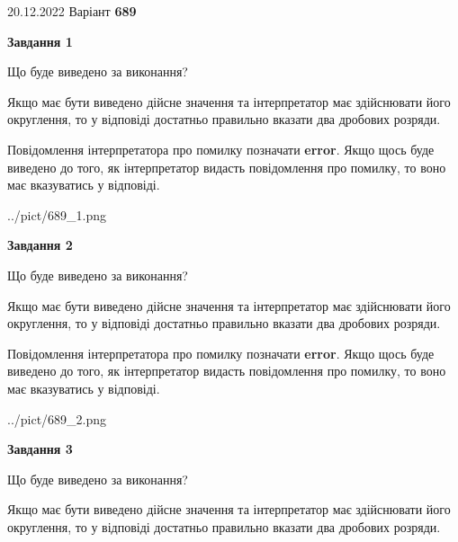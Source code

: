 \documentclass[12pt, ukrainian]{article}
\begin{document}
{20.12.2022 Варіант \No \textbf { 689 }\par}
{
\begin {Large}

{\begin {center}\textbf{Завдання 1}\end {center}}\par
Що буде виведено за виконання? \par

Якщо має бути виведено дійсне значення та інтерпретатор має здійснювати його округлення, 
то у відповіді достатньо правильно вказати два дробових розряди.

Повідомлення інтерпретатора про помилку позначати \textbf{error}.
Якщо щось буде виведено до того, як інтерпретатор видасть повідомлення про помилку, 
то воно має вказуватись у відповіді. \par

\begin{center}
	{../pict/689_1.png}
\end{center}
\newpage

{\begin {center}\textbf{Завдання 2}\end {center}}\par
Що буде виведено за виконання? \par

Якщо має бути виведено дійсне значення та інтерпретатор має здійснювати його округлення, 
то у відповіді достатньо правильно вказати два дробових розряди.

Повідомлення інтерпретатора про помилку позначати \textbf{error}.
Якщо щось буде виведено до того, як інтерпретатор видасть повідомлення про помилку, 
то воно має вказуватись у відповіді. \par

\begin{center}
	{../pict/689_2.png}
\end{center}
\newpage

{\begin {center}\textbf{Завдання 3}\end {center}}\par
Що буде виведено за виконання? \par

Якщо має бути виведено дійсне значення та інтерпретатор має здійснювати його округлення, 
то у відповіді достатньо правильно вказати два дробових розряди.


\end{Large}}
\end{document}

